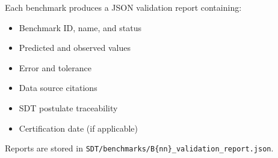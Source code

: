 \documentclass[12pt,a4paper]{report}
\begin{document}
Each benchmark produces a JSON validation report containing:
\begin{itemize}
  \item Benchmark ID, name, and status
  \item Predicted and observed values
  \item Error and tolerance
  \item Data source citations
  \item SDT postulate traceability
  \item Certification date (if applicable)
\end{itemize}

Reports are stored in \texttt{SDT/benchmarks/B\{nn\}\_validation\_report.json}.
\end{document}
